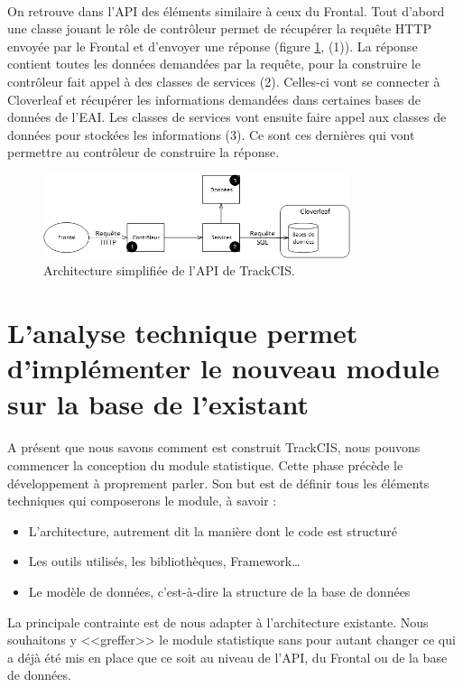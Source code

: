 			\paragraph{}
			On retrouve dans l'API des éléments similaire à ceux du Frontal. Tout d'abord
			une classe jouant le rôle de contrôleur permet de récupérer la requête HTTP
			envoyée par le Frontal et d'envoyer une réponse (figure
			\ref{archi_actuelle_api}, (1)). La réponse contient toutes les données
			demandées par la requête, pour la construire le contrôleur fait appel à des
			classes de services (2). Celles-ci vont se connecter à Cloverleaf et
			récupérer les informations demandées dans certaines bases de données de l'EAI. Les
			classes de services vont ensuite faire appel aux classes de données pour
			stockées les informations (3). Ce sont ces dernières qui vont permettre au
			contrôleur de construire la réponse.
			\begin{figure}[H]
				\centering
				\includegraphics[width=9cm]{../img/part3/archi_actuelle_api.png}
				\caption{\label{archi_actuelle_api} Architecture simplifiée de l'API de
				TrackCIS.}
			\end{figure}
	
	\section{L'analyse technique permet d'implémenter le nouveau module sur la base
	de l'existant}
		\paragraph{}
		A présent que nous savons comment est construit TrackCIS, nous pouvons
		commencer la conception du module statistique. Cette phase précède le
		développement à proprement parler. Son but est de définir tous les
		éléments techniques qui composerons le module, à savoir :
		\begin{itemize}
		  \item L'architecture, autrement dit la manière dont le code est structuré
		  \item Les outils utilisés, les bibliothèques, Framework\ldots
		  \item Le modèle de données, c'est-à-dire la structure de la base de données
		\end{itemize}
		La principale contrainte est de nous adapter à l'architecture existante. Nous
		souhaitons y <<greffer>> le module statistique sans pour autant changer ce qui
		a déjà été mis en place que ce soit au niveau de l'API, du Frontal ou de la
		base de données.
		
